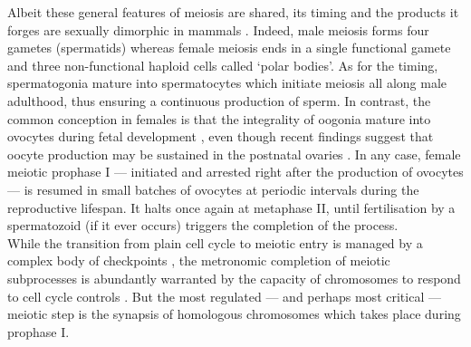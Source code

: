 


Albeit these general features of meiosis are shared, its timing and the products it forges are sexually dimorphic in mammals \citep[reviewed in][]{handel2010genetics}. 
Indeed, male meiosis forms four gametes (spermatids) whereas female meiosis ends in a single functional gamete and three non-functional haploid cells called ‘polar bodies’.
As for the timing, spermatogonia mature into spermatocytes which initiate meiosis all along male adulthood, thus ensuring a continuous production of sperm.
In contrast, the common conception in females is that the integrality of oogonia mature into ovocytes during fetal development \citep{pearl1921studies,zuckerman1951number}, even though recent findings suggest that oocyte production may be sustained in the postnatal ovaries \citep{johnson2004germline,johnson2005oocyte}.
In any case, female meiotic prophase I — initiated and arrested right after the production of ovocytes — is resumed in small batches of ovocytes at periodic intervals during the reproductive lifespan.
It halts once again at metaphase II, until fertilisation by a spermatozoid (if it ever occurs) triggers the completion of the process.\\

While the transition from plain cell cycle to meiotic entry is managed by a complex body of checkpoints \citep[reviewed in][]{marston2005meiosis}, the metronomic completion of meiotic subprocesses is abundantly warranted by the capacity of chromosomes to respond to cell cycle controls \citep[reviewed in][]{mckim1995chromosomal}.
But the most regulated — and perhaps most critical — meiotic step is the synapsis of homologous chromosomes which takes place during prophase I.



